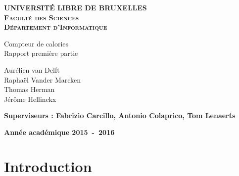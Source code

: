 \documentclass[a4paper, 11pt]{article}
\begin{document}
\begin{titlepage}
\begin{center}
\textbf{\textsc{UNIVERSIT\'E LIBRE DE BRUXELLES}}\\
\textbf{\textsc{Faculté des Sciences}}\\
\textbf{\textsc{Département d'Informatique}}
\vfill{}\vfill{}
\begin{center}{\Huge Compteur de calories\\Rapport première partie}\end{center}{\Huge \par}
\begin{center}{\large Aurélien van Delft\\Raphaël Vander Marcken\\Thomas Herman\\Jérôme Hellinckx}\end{center}{\Huge \par}
\vfill{}\vfill{}
\begin{flushleft}{\large \textbf{Superviseurs : Fabrizio Carcillo, Antonio Colaprico, Tom Lenaerts}}\hfill{}\end{flushleft}{\large\par}
\vfill{}\vfill{}\enlargethispage{3cm}
\textbf{Année académique 2015~-~2016}
\end{center}
\end{titlepage}

\tableofcontents
\newpage

\section{Introduction}
\end{document}

